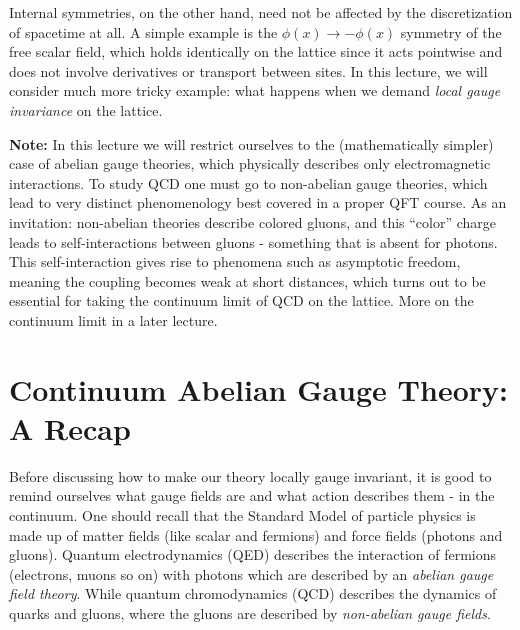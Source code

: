 \documentclass[11pt]{article}
\theoremstyle{definition}
\begin{document}
Internal symmetries, on the other hand, need not be affected by the discretization of spacetime at all. A simple example is the $\phi(x) \to -\phi(x)$ symmetry of the free scalar field, which holds identically on the lattice since it acts pointwise and does not involve derivatives or transport between sites. In this lecture, we will consider much more tricky example: what happens when we demand \textit{local gauge invariance} on the lattice.

\textbf{Note:} In this lecture we will restrict ourselves to the 
(mathematically simpler) case of abelian gauge theories, which physically 
describes only electromagnetic interactions. To study QCD one must go to 
non-abelian gauge theories, which lead to very distinct phenomenology best 
covered in a proper QFT course. As an invitation: non-abelian theories 
describe colored gluons, and this ``color'' charge leads to self-interactions 
between gluons - something that is absent for photons. This self-interaction 
gives rise to phenomena such as asymptotic freedom, meaning the coupling 
becomes weak at short distances, which turns out to be essential for taking 
the continuum limit of QCD on the lattice. More on the continuum limit in a 
later lecture.

\section{Continuum Abelian Gauge Theory: A Recap}\label{sec:cont_ym}
Before discussing how to make our theory locally gauge invariant, it is good to remind ourselves what gauge fields are and what action describes them - in the continuum. One should recall that the Standard Model of particle physics is made up of matter fields (like scalar and fermions) and force fields (photons and gluons). Quantum electrodynamics (QED) describes the interaction of fermions (electrons, muons so on) with photons which are described by an \textit{abelian gauge field theory}. While quantum chromodynamics (QCD) describes the dynamics of quarks and gluons, where the gluons are described by \textit{non-abelian gauge fields}. 
\end{document}

